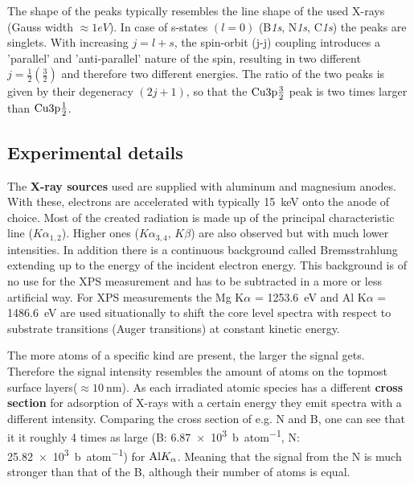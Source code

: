 The shape of the peaks typically resembles the line shape of the used X-rays (Gauss width $\approx 1eV$). In case of s-states $(l=0)$ (B\textit{1s}, N\textit{1s}, C\textit{1s}) the peaks are singlets. With increasing $j=l+s$, the spin-orbit (j-j) coupling introduces a 'parallel' and 'anti-parallel' nature of the spin, resulting in two different $j=\frac{1}{2}(\frac{3}{2})$ and therefore two different energies.
The ratio of the two peaks is given by their degeneracy $(2j+1)$\cite[113]{Riviere_90}, so that the $\textnormal{Cu3p}\frac{3}{2}$ peak is two times larger than $\textnormal{Cu3p}\frac{1}{2}$.

\subsection{Experimental details}
The \textbf{X-ray sources} used are supplied with aluminum and magnesium anodes.
With these, electrons are accelerated with typically \SI{15}{\keV} onto the anode of choice. Most of the created radiation is made up of the principal characteristic line ($K\alpha_{1,2}$). Higher ones ($K\alpha_{3,4}$, $K\beta$) are also observed but with much lower intensities. In addition there is a continuous background called Bremsstrahlung extending up to the energy of the incident electron energy. This background is of no use for the XPS measurement and has to be subtracted in a more or less artificial way. For XPS measurements the Mg K$\alpha$ = \SI{1253.6}{\eV} and Al K$\alpha$ = \SI{1486.6}{\eV} are used situationally to shift the core level spectra with respect to substrate transitions (Auger transitions) at constant kinetic energy.

The more atoms of a specific kind are present, the larger the signal gets. Therefore the signal intensity resembles the amount of atoms on the topmost surface layers($\approx \SI{10}{\nm}$). As each irradiated atomic species has a different \textbf{cross section} for adsorption of X-rays with a certain energy they emit spectra with a different intensity. Comparing the cross section of e.g. N and B, one can see that it it roughly 4 times as large (B: \SI{6,87e3}{\barn\per atom}, N: \SI{25,82e3}{\barn\per atom}) for $\textnormal{Al} K_{\alpha}$\cite{henke_x-ray_1993}. Meaning that the signal from the N is much stronger than that of the B, although their number of atoms is equal.


